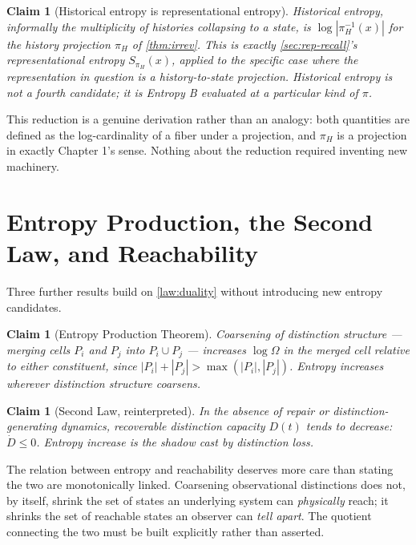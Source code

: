 \documentclass[12pt]{report}
\newtheorem{claim}[definition]{Claim}
\begin{document}
\begin{claim}[Historical entropy is representational entropy]
\label{claim:historical-reduces}
Historical entropy, informally the multiplicity of histories collapsing
to a state, is $\log|\pi_H^{-1}(x)|$ for the history projection
$\pi_H$ of \cref{thm:irrev}. This is exactly \cref{sec:rep-recall}'s
representational entropy $S_{\pi_H}(x)$, applied to the specific case
where the representation in question is a history-to-state projection.
Historical entropy is not a fourth candidate; it is Entropy B evaluated
at a particular kind of $\pi$.
\end{claim}

This reduction is a genuine derivation rather than an analogy: both
quantities are defined as the log-cardinality of a fiber under a
projection, and $\pi_H$ is a projection in exactly Chapter 1's sense.
Nothing about the reduction required inventing new machinery.

\section{Entropy Production, the Second Law, and Reachability}
\label{sec:production}

Three further results build on \cref{law:duality} without introducing
new entropy candidates.

\begin{claim}[Entropy Production Theorem]
\label{thm:production}
Coarsening of distinction structure --- merging cells $P_i$ and $P_j$
into $P_i \cup P_j$ --- increases $\log\Omega$ in the merged cell relative
to either constituent, since $|P_i| + |P_j| > \max(|P_i|,|P_j|)$. Entropy
increases wherever distinction structure coarsens.
\end{claim}

\begin{claim}[Second Law, reinterpreted]
\label{law:second}
In the absence of repair or distinction-generating dynamics, recoverable
distinction capacity $D(t)$ tends to decrease: $\dot{D} \leq 0$. Entropy
increase is the shadow cast by distinction loss.
\end{claim}

The relation between entropy and reachability deserves more care than
stating the two are monotonically linked. Coarsening observational
distinctions does not, by itself, shrink the set of states an underlying
system can \emph{physically} reach; it shrinks the set of reachable
states an observer can \emph{tell apart}. The quotient connecting the two
must be built explicitly rather than asserted.
\end{document}
